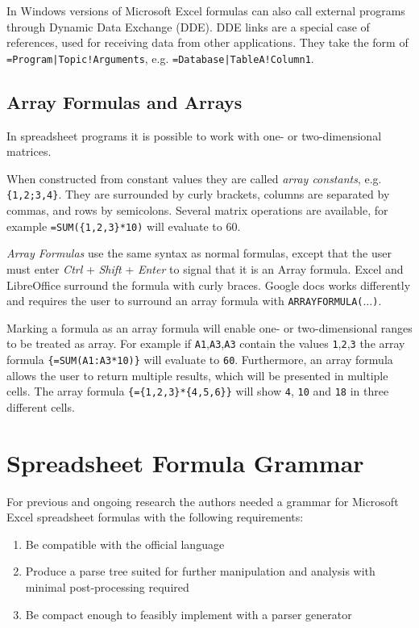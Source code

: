 \documentclass[conference]{IEEEtran}
\begin{document}
In Windows versions of Microsoft Excel formulas can also call external programs through Dynamic Data Exchange (DDE). DDE links are a special case of references, used for receiving data from other applications. They take the form of \texttt{=Program|Topic!Arguments}, e.g. \texttt{=Database|TableA!Column1}.

\subsection{Array Formulas and Arrays}
\label{sec:arrayformulas}
In spreadsheet programs it is possible to work with one- or two-dimensional matrices.

When constructed from constant values they are called \emph{array constants}, e.g. \texttt{\{1,2;3,4\}}.
They are surrounded by curly brackets, columns are separated by commas, and rows by semicolons.
Several matrix operations are available, for example \texttt{=SUM(\{1,2,3\}*10)} will evaluate to 60.

\emph{Array Formulas} use the same syntax as normal formulas, except that the user must enter \emph{Ctrl} + \emph{Shift} + \emph{Enter} to signal that it is an Array formula.
Excel and LibreOffice surround the formula with curly braces.
Google docs works differently and requires the user to surround an array formula with \texttt{ARRAYFORMULA($\ldots$)}.

Marking a formula as an array formula will enable one- or two-dimensional ranges to be treated as array.
For example if \texttt{A1},\texttt{A3},\texttt{A3} contain the values \texttt{1},\texttt{2},\texttt{3} the array formula \texttt{\{=SUM(A1:A3*10)\}} will evaluate to \texttt{60}. Furthermore, an array formula allows the user to return multiple results, which will be presented in multiple cells.
The array formula \texttt{\{=\{1,2,3\}*\{4,5,6\}\}} will show \texttt{4}, \texttt{10} and \texttt{18} in three different cells.

\section{Spreadsheet Formula Grammar}
\label{section:grammar}

For previous and ongoing research the authors needed a grammar for Microsoft Excel spreadsheet formulas with the following requirements:

\label{sec:designgoals}
\begin{enumerate}
\item Be compatible with the official language
\item Produce a parse tree suited for further manipulation and analysis with minimal post-processing required
\item Be compact enough to feasibly implement with a parser generator
\end{enumerate}
\end{document}
